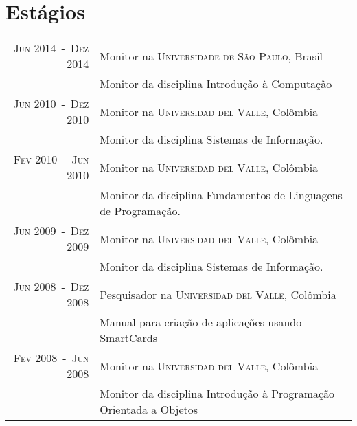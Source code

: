 \documentclass[a4paper,10pt]{article}
\begin{document}
\section{Estágios}
\begin{tabular}{rl}

  \textsc{Jun 2014~-~Dez 2014}  & Monitor na \textsc{Universidade de São Paulo}, Brasil \\
                                &\footnotesize{Monitor da disciplina Introdução à Computação} \\

  \textsc{Jun 2010~-~Dez 2010}  & Monitor na \textsc{Universidad del Valle}, Colômbia \\
                                &\footnotesize{Monitor da disciplina Sistemas de Informação.} \\

  \textsc{Fev 2010~-~Jun 2010}  & Monitor na \textsc{Universidad del Valle}, Colômbia \\
                                &\footnotesize{Monitor da disciplina Fundamentos de Linguagens de Programação.} \\

  \textsc{Jun 2009~-~Dez 2009}  & Monitor na \textsc{Universidad del Valle}, Colômbia \\
                                &\footnotesize{Monitor da disciplina Sistemas de Informação.} \\

  \textsc{Jun 2008~-~Dez 2008}  & Pesquisador na \textsc{Universidad del Valle}, Colômbia \\
                                &\footnotesize{Manual para criação de aplicações usando SmartCards} \\

  \textsc{Fev 2008~-~Jun 2008}  & Monitor na \textsc{Universidad del Valle}, Colômbia \\
                                &\footnotesize{Monitor da disciplina Introdução à Programação Orientada a Objetos} \\

\end{tabular}
\end{document}
